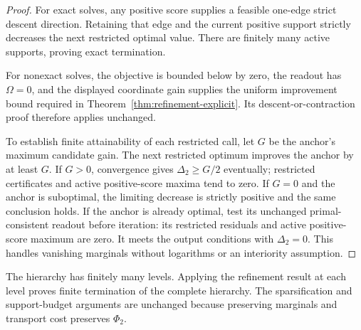 \begin{proof}
For exact solves, any positive score supplies a feasible one-edge strict descent direction.
Retaining that edge and the current positive support strictly decreases the next restricted optimal value.
There are finitely many active supports, proving exact termination.

For nonexact solves, the objective is bounded below by zero, the readout has $\Omega=0$, and the displayed coordinate gain supplies the uniform improvement bound required in Theorem~\ref{thm:refinement-explicit}.
Its descent-or-contraction proof therefore applies unchanged.

To establish finite attainability of each restricted call, let $G$ be the anchor's maximum candidate gain.
The next restricted optimum improves the anchor by at least $G$.
If $G>0$, convergence gives $\Delta_2\geq G/2$ eventually; restricted certificates and active positive-score maxima tend to zero.
If $G=0$ and the anchor is suboptimal, the limiting decrease is strictly positive and the same conclusion holds.
If the anchor is already optimal, test its unchanged primal-consistent readout before iteration: its restricted residuals and active positive-score maximum are zero.
It meets the output conditions with $\Delta_2=0$.
This handles vanishing marginals without logarithms or an interiority assumption.
\end{proof}

The hierarchy has finitely many levels.
Applying the refinement result at each level proves finite termination of the complete hierarchy.
The sparsification and support-budget arguments are unchanged because preserving marginals and transport cost preserves $\Phi_2$.
